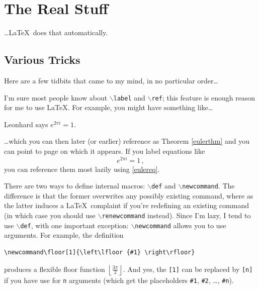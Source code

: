 \chapter{The Real Stuff}

\dots \LaTeX \ does that automatically.

\section{Various Tricks}

Here are a few tidbits that came to my mind, in no particular order\dots

I'm sure most people know about {\tt $\backslash$label} and {\tt $\backslash$ref}; this feature is enough reason for me to use \LaTeX. 
For example, you might have something like\dots

\begin{theorem}[Euler]\label{eulerthm}
Leonhard says $e^{ 2 \pi i } = 1$.
\end{theorem}

\dots which you can then later (or earlier) reference as Theorem \ref{eulerthm} and you can point to page \pageref{eulerthm} on which it appears.
If you label equations like
\begin{equation}\label{eulereq}
  e^{ 2 \pi i } = 1 \, ,
\end{equation}
you can reference them most lazily using \eqref{eulereq}.

\def\v{{\mathbf v}}
\def\P{{\mathcal P}}
\def\Z{\mathbb{Z}}
\newcommand\floor[1]{\left\lfloor {#1} \right\rfloor} 

There are two ways to define internal macros: {\tt $\backslash$def} and {\tt $\backslash$newcommand}. The difference is that the former overwrites any possibly existing command,
where as the latter induces a \LaTeX \ complaint if you're redefining an existing command (in which case you should use {\tt $\backslash$renewcommand} instead). Since I'm lazy,
I tend to use {\tt $\backslash$def}, with one important exception: {\tt $\backslash$newcommand} allows you to use arguments. For example, the definition
\begin{verbatim}
\newcommand\floor[1]{\left\lfloor {#1} \right\rfloor} 
\end{verbatim}
produces a flexible floor function $\floor{\frac{ 3\pi }{ 2 }}$. And yes, the {\tt [1]} can be replaced by {\tt [n]} if you have use for {\tt n} arguments (which get the
placeholders {\tt \#1}, {\tt \#2}, \dots, {\tt \#n}).

